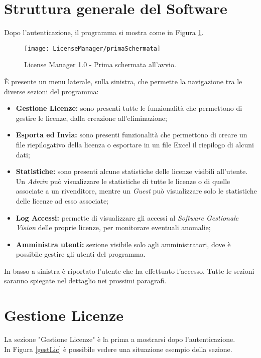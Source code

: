 \section{Struttura generale del Software}
Dopo l'autenticazione, il programma si mostra come in Figura \ref{primscher}.

\begin{figure}[!h] 
    \centering 
    \texttt{[image: LicenseManager/primaSchermata]} 
    \caption{License Manager 1.0 - Prima schermata all'avvio.}
    \label{primscher}
\end{figure}

È presente un menu laterale, sulla sinistra, che permette la navigazione tra le diverse sezioni del programma:

\begin{itemize}
\item \textbf{Gestione Licenze:} sono presenti tutte le funzionalità che permettono di gestire le licenze, dalla creazione all’eliminazione;
\item \textbf{Esporta ed Invia:} sono presenti funzionalità che permettono di creare un file riepilogativo della licenza o esportare in un file Excel il riepilogo di alcuni dati;
\item \textbf{Statistiche:} sono presenti alcune statistiche delle licenze visibili all’utente. Un \textit{Admin} può visualizzare le statistiche di tutte le licenze o di quelle associate a un rivenditore, mentre un \textit{Guest} può visualizzare solo le statistiche delle licenze ad esso associate;
\item \textbf{Log Accessi:} permette di visualizzare gli accessi al \textit{Software Gestionale Vision} delle proprie licenze, per monitorare eventuali anomalie;
\item \textbf{Amministra utenti:} sezione visibile solo agli amministratori, dove è possibile gestire gli utenti del programma.

\end{itemize}

In basso a sinistra è riportato l’utente che ha effettuato l'accesso.
Tutte le sezioni saranno spiegate nel dettaglio nei prossimi paragrafi.

\newpage
\section{Gestione Licenze}
La sezione "Gestione Licenze" è la prima a mostrarsi dopo l'autenticazione. \\ In Figura \ref{gestLic} è possibile vedere una situazione esempio della sezione.

